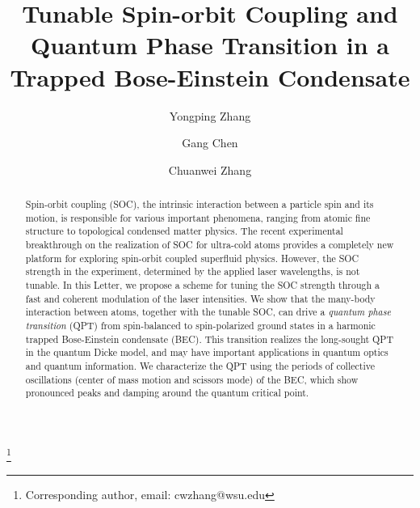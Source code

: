 \documentclass[prl,twocolumn,superscriptaddress,showpacs,floatfix]{revtex4}
\begin{document}
\title{Tunable Spin-orbit Coupling and Quantum Phase Transition in a Trapped
Bose-Einstein Condensate}
\author{Yongping Zhang}
\author{Gang Chen}
\author{Chuanwei Zhang}
\thanks{Corresponding author, email: cwzhang@wsu.edu}

\begin{abstract}
Spin-orbit coupling (SOC), the intrinsic interaction between a particle spin
and its motion, is responsible for various important phenomena, ranging from
atomic fine structure to topological condensed matter physics. The recent
experimental breakthrough on the realization of SOC for ultra-cold atoms
provides a completely new platform for exploring spin-orbit coupled
superfluid physics. However, the SOC strength in the experiment, determined
by the applied laser wavelengths, is not tunable. In this Letter, we propose
a scheme for tuning the SOC strength through a fast and coherent modulation
of the laser intensities. We show that the many-body interaction between
atoms, together with the tunable SOC, can drive a \textit{quantum phase
transition} (QPT) from spin-balanced to spin-polarized ground states in a
harmonic trapped Bose-Einstein condensate (BEC). This transition realizes
the long-sought QPT in the quantum Dicke model, and may have important
applications in quantum optics and quantum information. We characterize the
QPT using the periods of collective oscillations (center of mass motion and
scissors mode) of the BEC, which show pronounced peaks and damping around
the quantum critical point.
\end{abstract}

\maketitle

\end{document}
